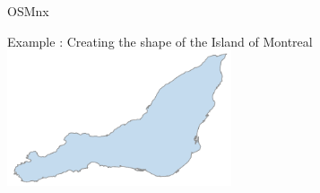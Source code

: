 \documentclass[aspectratio=169]{beamer}
\begin{document}
\begin{frame}{OSMnx \cite{boeing2017osmnx}}

{\Large Example : Creating the shape of the Island of Montreal}
{\small }
\centering
\includegraphics[height=4cm]{figures/montreal_shape}

\end{frame}
\end{document}
